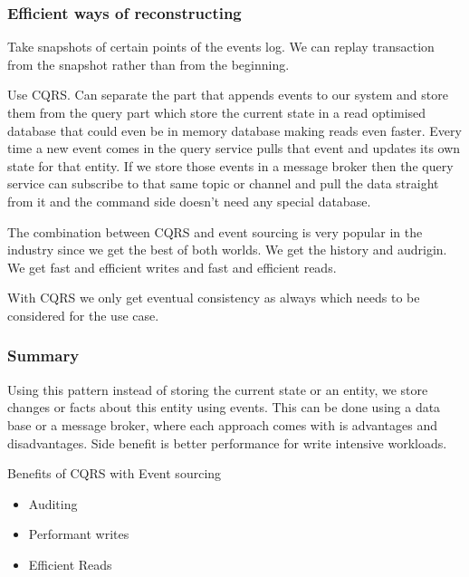 \subsubsection{Efficient ways of reconstructing}
Take snapshots of certain points of the events log.
We can replay transaction from the snapshot rather than from the beginning.

Use CQRS\@.
Can separate the part that appends events to our system and store them from the query part which store the current state in a read optimised database that could even be in memory database making reads even faster.
Every time a new event comes in the query service pulls that event and updates its own state for that entity.
If we store those events in a message broker then the query service can subscribe to that same topic or channel and pull the data straight from it and the command side doesn't need any special database.

The combination between CQRS and event sourcing is very popular in the industry since we get the best of both worlds.
We get the history and audrigin.
We get fast and efficient writes and fast and efficient reads.

With CQRS we only get eventual consistency as always which needs to be considered for the use case.

\subsubsection{Summary}
Using this pattern instead of storing the current state or an entity, we store changes or facts about this entity using events.
This can be done using a data base or a message broker, where each approach comes with is advantages and disadvantages.
Side benefit is better performance for write intensive workloads.

Benefits of CQRS with Event sourcing
\begin{itemize}
    \item Auditing
    \item Performant writes
    \item Efficient Reads
\end{itemize}
